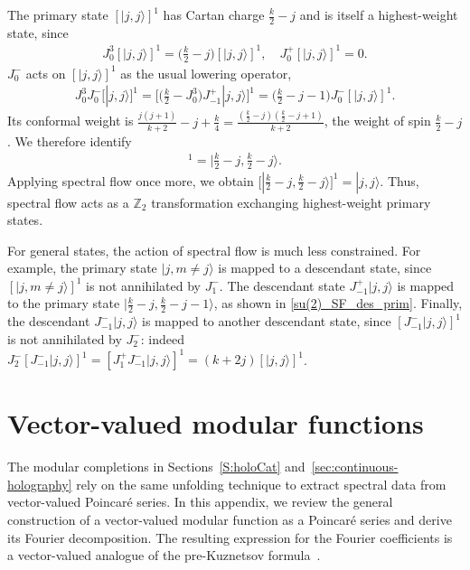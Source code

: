 \documentclass[11pt]{article}
\numberwithin{equation}{section}
\begin{document}
The primary state $[|j,j\rangle]^1$ has Cartan charge $\frac{k}{2}-j$ and is itself a highest-weight state, since
\begin{align}
    J_0^3[|j,j\rangle]^1 = \Big(\frac{k}{2}-j\Big) [|j,j\rangle]^1, \quad J_0^{+} [|j,j\rangle]^1=0.
\end{align}
$J_0^-$ acts on $[|j,j\rangle]^1$ as the usual lowering operator,
\begin{align}
    J_0^3 J_0^- [|j,j\rangle]^1 =\Big[\Big(\frac{k}{2}-J_0^3\Big)J_{-1}^+ |j,j\rangle\Big]^1=\Big(\frac{k}{2}-j-1\Big)J_0^- [|j,j\rangle]^1.
    \label{su(2)_SF_des_prim}
\end{align}
Its conformal weight is $\frac{j(j+1)}{k+2}-j+\frac{k}{4}=\frac{(\frac k2-j)(\frac k2-j+1)}{k+2}$, the weight of spin $\frac k2-j$. We therefore identify
\begin{align}
     [|j,j\rangle]^1=\Big|\frac{k}{2}-j,\frac{k}{2}-j\Big\rangle.
\end{align}
Applying spectral flow once more, we obtain $[|\frac{k}{2}-j,\frac{k}{2}-j\rangle]^1=|j,j\rangle$. Thus, spectral flow acts as a $\mathbb{Z}_2$ transformation exchanging highest-weight primary states.

For general states, the action of spectral flow is much less constrained. For example, the primary state $|j,m\neq j\rangle$ is mapped to a descendant state, since $[|j,m\neq j\rangle]^1$ is not annihilated by $J_1^-$. The descendant state $J_{-1}^+|j,j\rangle$ is mapped to the primary state $|\frac{k}{2}-j,\frac{k}{2}-j-1\rangle$, as shown in \eqref{su(2)_SF_des_prim}. Finally, the descendant $J_{-1}^{-}|j,j\rangle$ is mapped to another descendant state, since $[J_{-1}^{-}|j,j\rangle]^1$ is not annihilated by $J_{2}^-$: indeed $J_2^-[J_{-1}^{-}|j,j\rangle]^1=[J_1^+J_{-1}^-|j,j\rangle]^1=(k+2j)[|j,j\rangle]^1$.

\section{Vector-valued modular functions}
\label{app:modular-sums}

The modular completions in Sections~\ref{S:holoCat} and~\ref{sec:continuous-holography}
rely on the same unfolding technique to extract spectral data from vector-valued
Poincar\'e series. In this appendix, we review the general construction of a
vector-valued modular function as a Poincar\'e series and derive its Fourier
decomposition. The resulting expression for the Fourier coefficients is a vector-valued
analogue of the pre-Kuznetsov formula~\cite{Iwaniec2002SpectralMO}.
\end{document}
